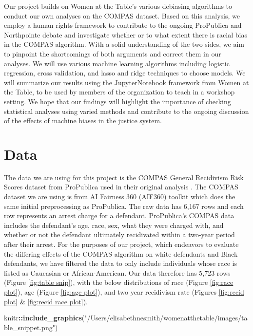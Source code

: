 \documentclass[water,article,submit,moreauthors,pdftex]{mdpi}
\newenvironment{Shaded}{\begin{snugshade}}{\end{snugshade}}
\newcommand{\KeywordTok}[1]{\textcolor[rgb]{0.13,0.29,0.53}{\textbf{#1}}}
\newcommand{\NormalTok}[1]{#1}
\newcommand{\OperatorTok}[1]{\textcolor[rgb]{0.81,0.36,0.00}{\textbf{#1}}}
\newcommand{\StringTok}[1]{\textcolor[rgb]{0.31,0.60,0.02}{#1}}
\begin{document}
Our project builds on Women at the Table's various debiasing algorithms
to conduct our own analyses on the COMPAS dataset. Based on this
analysis, we employ a human rights framework to contribute to the
ongoing ProPublica and Northpointe debate and investigate whether or to
what extent there is racial bias in the COMPAS algorithm. With a solid
understanding of the two sides, we aim to pinpoint the shortcomings of
both arguments and correct them in our analyses. We will use various
machine learning algorithms including logistic regression, cross
validation, and lasso and ridge techniques to choose models. We will
summarize our results using the JupyterNotebook framework from Women at
the Table, to be used by members of the organization to teach in a
workshop setting. We hope that our findings will highlight the
importance of checking statistical analyses using varied methods and
contribute to the ongoing discussion of the effects of machine biases in
the justice system.

\hypertarget{data}{%
\section{Data}\label{data}}

The data we are using for this project is the COMPAS General Recidivism
Risk Scores dataset from ProPublica used in their original analysis
\citep{larson_propublicacompas-analysiscompas-scores-two-yearscsv_2022}.
The COMPAS dataset we are using is from AI Fairness 360 (AIF360) toolkit
\citep{noauthor_trusted-ai_360} which does the same initial
preprocessing as ProPublica. The raw data has 6,167 rows and each row
represents an arrest charge for a defendant. ProPublica's COMPAS data
includes the defendant's age, race, sex, what they were charged with,
and whether or not the defendant ultimately recidivated within a
two-year period after their arrest. For the purposes of our project,
which endeavors to evaluate the differing effects of the COMPAS
algorithm on white defendants and Black defendants, we have filtered the
data to only include individuals whose race is listed as Caucasian or
African-American. Our data therefore has 5,723 rows (Figure
\ref{fig:table snip}), with the below distributions of race (Figure
\ref{fig:race plot}), age (Figure \ref{fig:age plot}), and two year
recidivism rate (Figures \ref{fig:recid plot} \&
\ref{fig:recid race plot}).

\begin{Shaded}
\begin{Highlighting}[]
\NormalTok{knitr}\OperatorTok{::}\KeywordTok{include_graphics}\NormalTok{(}\StringTok{"/Users/elisabethnesmith/womenatthetable/images/table_snippet.png"}\NormalTok{)}
\end{Highlighting}
\end{Shaded}
\end{document}
